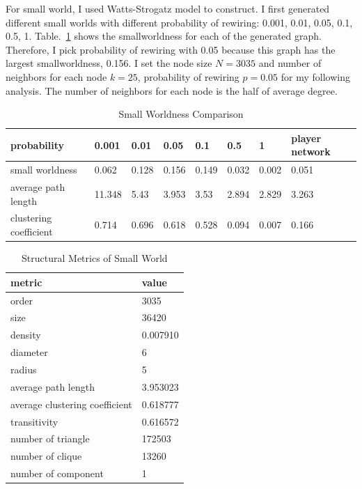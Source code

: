 \documentclass[runningheads]{llncs}
\begin{document}
For small world, I used Watts-Strogatz model to construct. I first generated different small worlds with different probability of rewiring: 0.001, 0.01, 0.05, 0.1, 0.5, 1. Table.~\ref{tab_sm_comparison} shows the smallworldness for each of the generated graph. Therefore, I pick probability of rewiring with 0.05 because this graph has the largest smallworldness, 0.156. I set the node size \(N = 3035\) and number of neighbors for each node \( k =25 \), probability of rewiring \( p = 0.05 \) for my following analysis. The number of neighbors for each node is the half of average degree.

\begin{table}
\centering
\caption{Small Worldness Comparison}\label{tab_sm_comparison}
\begin{tabular}{|l|l|l|l|l|l|l|l|}
\hline
probability & 0.001 & 0.01 & 0.05 & 0.1 & 0.5 & 1 & player network \\ \hline
small worldness & 0.062 & 0.128 & 0.156 & 0.149 & 0.032 & 0.002 & 0.051 \\ \hline
average path length & 11.348 & 5.43 & 3.953 & 3.53 & 2.894 & 2.829 & 3.263 \\ \hline
clustering coefficient & 0.714 & 0.696 & 0.618 & 0.528 & 0.094 & 0.007 & 0.166 \\ \hline

\end{tabular}
\end{table}


\begin{table}
\centering
\caption{Structural Metrics of Small World}\label{tab_smallworld}
\begin{tabular}{|l|l|}
\hline
metric & value \\
\hline
order & 3035 \\
size & 36420 \\
density & 0.007910 \\
diameter & 6 \\
radius & 5 \\
average path length & 3.953023 \\
average clustering coefficient & 0.618777 \\
transitivity & 0.616572 \\
number of triangle & 172503 \\
number of clique & 13260 \\
number of component & 1 \\
\hline
\end{tabular}
\end{table}
\end{document}
